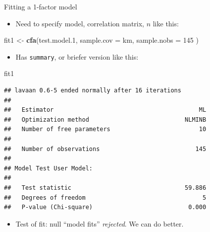 \documentclass[ignorenonframetext,]{beamer}
\newenvironment{Shaded}{\begin{snugshade}}{\end{snugshade}}
\newcommand{\DataTypeTok}[1]{\textcolor[rgb]{0.13,0.29,0.53}{#1}}
\newcommand{\DecValTok}[1]{\textcolor[rgb]{0.00,0.00,0.81}{#1}}
\newcommand{\FloatTok}[1]{\textcolor[rgb]{0.00,0.00,0.81}{#1}}
\newcommand{\KeywordTok}[1]{\textcolor[rgb]{0.13,0.29,0.53}{\textbf{#1}}}
\newcommand{\NormalTok}[1]{#1}
\newcommand{\StringTok}[1]{\textcolor[rgb]{0.31,0.60,0.02}{#1}}
\providecommand{\tightlist}{%
  \setlength{\itemsep}{0pt}\setlength{\parskip}{0pt}}
\begin{document}
\begin{frame}[fragile]{Fitting a 1-factor model}
\protect\hypertarget{fitting-a-1-factor-model}{}

\begin{itemize}
\tightlist
\item
  Need to specify model, correlation matrix, \(n\) like this:
\end{itemize}

\begin{Shaded}
\begin{Highlighting}[]
\NormalTok{fit1 <-}\StringTok{ }\KeywordTok{cfa}\NormalTok{(test.model}\FloatTok{.1}\NormalTok{,}
  \DataTypeTok{sample.cov =}\NormalTok{ km,}
  \DataTypeTok{sample.nobs =} \DecValTok{145}
\NormalTok{)}
\end{Highlighting}
\end{Shaded}

\begin{itemize}
\tightlist
\item
  Has \texttt{summary}, or briefer version like this:
\end{itemize}

\scriptsize

\begin{Shaded}
\begin{Highlighting}[]
\NormalTok{fit1}
\end{Highlighting}
\end{Shaded}

\begin{verbatim}
## lavaan 0.6-5 ended normally after 16 iterations
## 
##   Estimator                                         ML
##   Optimization method                           NLMINB
##   Number of free parameters                         10
##                                                       
##   Number of observations                           145
##                                                       
## Model Test User Model:
##                                                       
##   Test statistic                                59.886
##   Degrees of freedom                                 5
##   P-value (Chi-square)                           0.000
\end{verbatim}

\normalsize

\begin{itemize}
\tightlist
\item
  Test of fit: null ``model fits'' \emph{rejected}. We can do better.
\end{itemize}

\end{frame}
\end{document}
